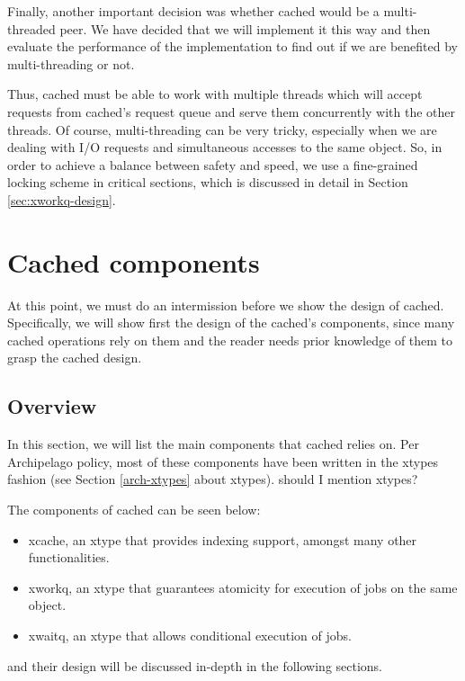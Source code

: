 Finally, another important decision was whether cached would be a 
multi-threaded peer. We have decided that we will implement it this way and 
then evaluate the performance of the implementation to find out if we are 
benefited by multi-threading or not.

Thus, cached must be able to work with multiple threads which will accept 
requests from cached's request queue and serve them concurrently with the other 
threads. Of course, multi-threading can be very tricky, especially when we are 
dealing with I/O requests and simultaneous accesses to the same object.  So, in 
order to achieve a balance between safety and speed, we use a
fine-grained locking scheme in critical sections, which is discussed in detail 
in Section \ref{sec:xworkq-design}.

\section{Cached components}\label{sec:comp-design}

At this point, we must do an intermission before we show the design of cached.  
Specifically, we will show first the design of the cached's components, since 
many cached operations rely on them and the reader needs prior knowledge of 
them to grasp the cached design.

\subsection{Overview}

In this section, we will list the main components that cached relies on. Per 
Archipelago policy, most of these components have been written in the xtypes 
fashion (see Section \ref{arch-xtypes} about xtypes).  \fixme should I mention 
xtypes?

The components of cached can be seen below:
 
\begin{itemize}
	\item xcache, an xtype that provides indexing support, amongst many other 
		functionalities.
	\item xworkq, an xtype that guarantees atomicity for execution of jobs on 
		the same object.
	\item xwaitq, an xtype that allows conditional execution of jobs.
\end{itemize}

and their design will be discussed in-depth in the following sections.

